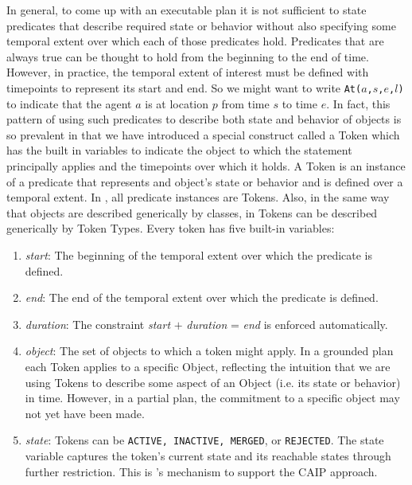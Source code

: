 \begin{description}
  In general, to come up with an executable plan it is not sufficient
  to state predicates that describe required state or behavior without
  also specifying some temporal extent over which each of those
  predicates hold. Predicates that are always true can be thought to
  hold from the beginning to the end of time. However, in practice,
  the temporal extent of interest must be defined with timepoints to
  represent its start and end. So we might want to write
  \texttt{At($a$,$s$,$e$,$l$)} to indicate that the agent $a$ is at
  location $p$ from time $s$ to time $e$. In fact, this pattern of
  using such predicates to describe both state and behavior of objects
  is so prevalent in \eu that we have introduced a special construct
  called a Token which has the built in variables to indicate the
  object to which the statement principally applies and the timepoints
  over which it holds. A Token is an instance of a predicate that
  represents and object's state or behavior and is defined over a
  temporal extent. In \eu, all predicate instances are Tokens. Also,
  in the same way that objects are described generically by classes,
  in \eu Tokens can be described generically by Token Types. Every
  token has five built-in variables:

  \begin{enumerate}

  \item \textit {start}: The beginning of the temporal extent over
    which the predicate is defined.

  \item \textit {end}: The end of the temporal extent over which the
    predicate is defined.

  \item \textit {duration}: The constraint \textit{start} $+$
    \textit{duration} = \textit{end} is enforced automatically.

  \item \textit{object}: The set of objects to which a token might
    apply. In a grounded plan each Token applies to a specific Object,
    reflecting the intuition that we are using Tokens to describe some
    aspect of an Object (i.e. its state or behavior) in time. However,
    in a partial plan, the commitment to a specific object may not yet
    have been made.

  \item \textit{state}: Tokens can be \texttt{ACTIVE, INACTIVE,
      MERGED}, or \texttt{REJECTED}. The state variable captures the
    token's current state and its reachable states through further
    restriction.  This is \eu's mechanism to support the CAIP approach.


\end{enumerate}
\end{description}
